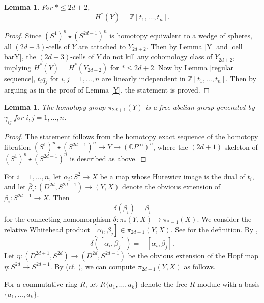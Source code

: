 \documentclass[a4paper]{amsart}
\numberwithin{equation}{section}
\newtheorem{lemma}[theorem]{Lemma}
\theoremstyle{definition}
\theoremstyle{remark}
\numberwithin{equation}{section}
\newcommand{\Z}{\mathbb{Z}}
\newcommand{\C}{\mathbb{C}}
\begin{document}
\begin{lemma}
  \label{barY}
  For $*\le 2d+2$,
  \[
    H^*(\overline{Y})=\Z[t_1,\ldots,t_n].
  \]
\end{lemma}

\begin{proof}
  Since $(S^1)^n\star(S^{2d-1})^n$ is homotopy equivalent to a wedge of spheres, all $(2d+3)$-cells of $\overline{Y}$ are attached to $Y_{2d+2}$. Then by Lemma \ref{Y} and \eqref{cell barY}, the $(2d+3)$-cells of $\overline{Y}$ do not kill any cohomology class of $\overline{Y}_{2d+2}$, implying $H^*(\overline{Y})=H^*(\overline{Y}_{2d+2})$ for $*\le 2d+2$. Now by Lemma \ref{regular sequence}, $t_iq_j$ for $i,j=1,\ldots,n$ are linearly independent in $\Z[t_1,\ldots,t_n]$. Then by arguing as in the proof of Lemma \ref{Y}, the statement is proved.
\end{proof}



\begin{lemma}
  \label{homotopy Y}
  The homotopy group $\pi_{2d+1}(Y)$ is a free abelian group generated by $\gamma_{ij}$ for $i,j=1,\ldots,n$.
\end{lemma}

\begin{proof}
  The statement follows from the homotopy exact sequence of the homotopy fibration $(S^1)^n\star(S^{2d-1})^n\to Y\to(\C P^\infty)^n$, where the $(2d+1)$-skeleton of $(S^1)^n\star(S^{2d-1})^n$ is described as above.
\end{proof}



For $i=1,\ldots,n$, let $\alpha_i\colon S^2\to X$ be a map whose Hurewicz image is the dual of $t_i$, and let $\bar{\beta}_i\colon(D^{2d},S^{2d-1})\to(Y,X)$ denote the obvious extension of $\beta_i\colon S^{2d-1}\to X$. Then
\[
  \delta(\bar{\beta}_i)=\beta_i
\]
for the connecting homomorphism $\delta\colon\pi_*(Y,X)\to\pi_{*-1}(X)$. We consider the relative Whitehead product $[\alpha_i,\bar{\beta}_j]\in\pi_{2d+1}(Y,X)$. See \cite{BM} for the definition. By \cite[(3.5)]{BM},
\[
  \delta([\alpha_i,\bar{\beta}_j])=-[\alpha_i,\beta_j].
\]
Let $\bar{\eta}\colon(D^{2d+1},S^{2d})\to(D^{2d},S^{2d-1})$ be the obvious extension of the Hopf map $\eta\colon S^{2d}\to S^{2d-1}$. By \cite[Theorem (1.4)]{J} (cf. \cite[(5.8)]{T}), we can compute $\pi_{2d+1}(Y,X)$ as follows.



For a commutative ring $R$, let $R\{a_1,\ldots,a_k\}$ denote the free $R$-module with a basis $\{a_1,\ldots,a_k\}$.
\end{document}
